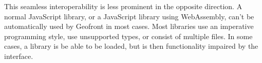 This seamless interoperability is less prominent in the opposite direction. 
A normal JavaScript library, or a JavaScript library using WebAssembly, can't be automatically used by Geofront in most cases. 
Most libraries use an imperative programming style, use unsupported types, or consist of multiple files.
In some cases, a library is be able to be loaded, but is then functionality impaired by the interface. 




  
  
  
